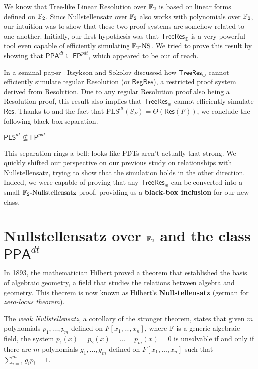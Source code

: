 We know that Tree-like Linear Resolution over $\mathbb{F}_2$ is based on linear forms defined on $\mathbb{F}_2$. Since Nullstellensatz over $\mathbb{F}_2$ also works with polynomials over $\mathbb{F}_2$, our intuition was to show that these two proof systems are somehow related to one another. Initially, our first hypothesis was that $\mathsf{TreeRes}_\oplus$ is a very powerful tool even capable of efficiently simulating $\mathrm{\mathbb{F}_2\text{-}NS}$. We tried to prove this result by showing that $\mathsf{PPA}^{dt} \subseteq \mathsf{FP}^{pdt}$, which appeared to be out of reach.

In a seminal paper \cite{res_lin_2}, Itsykson and Sokolov discussed how $\mathsf{TreeRes}_\oplus$ cannot efficiently simulate regular Resolution (or $\mathsf{RegRes}$), a restricted proof system derived from Resolution. Due to any regular Resolution proof also being a Resolution proof, this result also implies that $\mathsf{TreeRes}_\oplus$ cannot efficiently simulate $\mathsf{Res}$. Thanks to  and the fact that $\mathrm{PLS}^{dt}(S_F) = \Theta(\mathsf{Res}(F))$, we conclude the following black-box separation.

\begin{proposition}
    \label{pls_not_inside_fp_pdt}
    $\mathsf{PLS}^{dt} \not\subseteq \mathsf{FP}^{pdt}$
\end{proposition}

\newpage

This separation rings a bell: looks like PDTs aren't actually that strong. We quickly shifted our perspective on our previous study on relationships with Nullstellensatz, trying to show that the simulation holds in the other direction. Indeed, we were capable of proving that any $\mathsf{TreeRes}_\oplus$ can be converted into a small $\mathrm{\mathbb{F}_2\text{-}Nullstellensatz}$ proof, providing us a \textbf{black-box inclusion} for our new class.

\section{Nullstellensatz over $\mathbb{F}_2$ and the class $\mathsf{PPA}^{dt}$}

In 1893, the mathematician Hilbert proved a theorem that established the basis of algebraic geometry, a field that studies the relations between algebra and geometry. This theorem is now known as Hilbert's \textbf{Nullstellensatz} (german for \textit{zero-locus theorem}).

The \textit{weak Nullstellensatz}, a corollary of the stronger theorem, states that given $m$ polynomials $p_1, \ldots, p_m$ defined on $F[x_1, \ldots, x_n]$, where $\mathbb{F}$ is a generic algebraic field, the system $p_1(x) = p_2(x) = \ldots = p_m(x) = 0$ is unsolvable if and only if there are $m$ polynomials $g_1, \ldots, g_m$ defined on $F[x_1, \ldots, x_n]$ such that $\sum_{i=1}^m g_ip_i = 1$.

